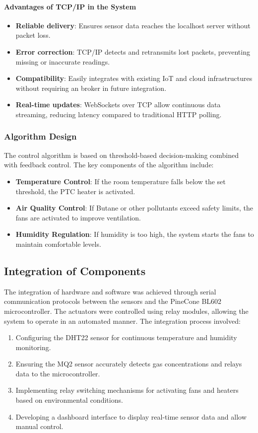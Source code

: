\documentclass[a4paper]{scrartcl}
\begin{document}
\paragraph{Advantages of TCP/IP in the System}
\begin{itemize}
    \item \textbf{Reliable delivery}: Ensures sensor data reaches the localhost server without packet loss.
    \item \textbf{Error correction}: TCP/IP detects and retransmits lost packets, preventing missing or inaccurate readings.
    \item \textbf{Compatibility}: Easily integrates with existing IoT and cloud infrastructures without requiring an broker in future integration.
    \item \textbf{Real-time updates}: WebSockets over TCP allow continuous data streaming, reducing latency compared to traditional HTTP polling.
\end{itemize}

\subsubsection{Algorithm Design}
The control algorithm is based on threshold-based decision-making combined with feedback control. The key components of the algorithm include:
\begin{itemize}
    \item \textbf{Temperature Control}: If the room temperature falls below the set threshold, the PTC heater is activated.
    \item \textbf{Air Quality Control}: If Butane or other pollutants exceed safety limits, the fans are activated to improve ventilation.
    \item \textbf{Humidity Regulation}: If humidity is too high, the system starts the fans to maintain comfortable levels.
\end{itemize}

\subsection{Integration of Components}
The integration of hardware and software was achieved through serial communication protocols between the sensors and the PineCone BL602 microcontroller. The actuators were controlled using relay modules, allowing the system to operate in an automated manner. The integration process involved:
\begin{enumerate}
    \item Configuring the DHT22 sensor for continuous temperature and humidity monitoring.
    \item Ensuring the MQ2 sensor accurately detects gas concentrations and relays data to the microcontroller.
    \item Implementing relay switching mechanisms for activating fans and heaters based on environmental conditions.
    \item Developing a dashboard interface to display real-time sensor data and allow manual control.
\end{enumerate}
\end{document}
